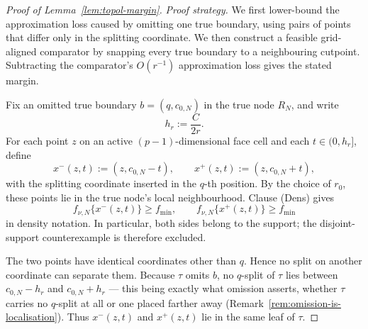 \documentclass[11pt]{article}
\theoremstyle{plain}
\theoremstyle{definition}
\theoremstyle{remark}
\begin{document}
\begin{proof}[Proof of Lemma~\ref{lem:topol-margin}]
\emph{Proof strategy.}
We first lower-bound the approximation loss caused by omitting one true
boundary, using pairs of points that differ only in the splitting coordinate.
We then construct a feasible grid-aligned comparator by snapping every true
boundary to a neighbouring cutpoint.  Subtracting the comparator's
\(O(r^{-1})\) approximation loss gives the stated margin.

Fix an omitted true boundary \(b=(q,c_{0,N})\) in the true node \(R_N\), and
write
\[
  h_r:=\frac{C}{2r}.
\]
For each point \(z\) on an active \((p-1)\)-dimensional face cell and each
\(t\in(0,h_r]\), define
\[
  x^-(z,t):=(z,c_{0,N}-t),
  \qquad
  x^+(z,t):=(z,c_{0,N}+t),
\]
with the splitting coordinate inserted in the \(q\)-th position.
By the choice of \(r_0\), these points lie in the true node's local
neighbourhood.  Clause (Dens) gives
\[
  f_{\nu,N}\{x^-(z,t)\}\ge f_{\min},
  \qquad
  f_{\nu,N}\{x^+(z,t)\}\ge f_{\min}
\]
in density notation.  In particular, both sides belong to the support; the
disjoint-support counterexample is therefore excluded.

The two points have identical coordinates other than \(q\).  Hence no split
on another coordinate can separate them.  Because \(\tau\) omits \(b\), no
\(q\)-split of \(\tau\) lies between \(c_{0,N}-h_r\) and
\(c_{0,N}+h_r\) --- this being exactly what omission asserts, whether
\(\tau\) carries no \(q\)-split at all or one placed farther away
(Remark~\ref{rem:omission-is-localisation}).  Thus \(x^-(z,t)\) and
\(x^+(z,t)\) lie in the same leaf of \(\tau\).


\end{proof}
\end{document}
